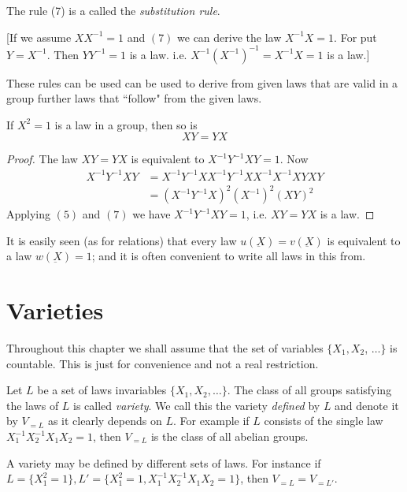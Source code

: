 The rule (7) is a called the \textit{substitution rule}.

[If we assume $XX^{-1} =1$ and $(7)$ we can derive the law $X^{-1}X =
  1$. For put $Y = X^{-1}$. Then $YY^{-1} =1$ is a law. i.e. $X^{-1}
  (X^{-1})^{-1}= X^{-1} X=1$ is a law.] 

These rules can be used can be used to derive from given laws that are
valid in a group further laws that ``follow" from the given laws. 

\begin{example*}
  If $X^2 = 1$ is a law in a group, then so is
  $$
  XY = YX
  $$
\end{example*}

\begin{proof}
  The law $XY = YX$ is equivalent to $X^{-1} Y^{-1} XY = 1$. Now 
  \begin{align*}
    X^{-1} Y^{-1} XY & = X^{-1}Y^{-1} XX^{-1} Y^{-1}XX^{-1}X^{-1} XYXY\\
    & = (X^{-1} Y^{-1}X)^2 (X^{-1})^2 (XY)^2
  \end{align*}
  Applying $(5)$ and $(7)$ we have $X^{-1}Y^{-1}XY = 1$, i.e. $XY =
  YX$ is a law.  
\end{proof}

It is easily seen (as for relations) that every law $u(\underbar{X}) =
v(\underbar{X})$ is equivalent to a law $w (\underbar{X}) = 1$; and it
is often convenient to write all laws in this from. 

\section{Varieties}\label{chap5:sec2} %

Throughout this chapter we shall assume that the set of variables 
$\bigg\{ X_1, X_2$, $\ldots \bigg\}$ is countable. This is just for
convenience and not a real restriction. 

Let $L$ be a set of laws invariables $\bigg\{ X_1, X_2, \ldots
\bigg\}$. The class of all groups satisfying the laws of $L$ is called
\textit{variety}. We call this the variety \textit{defined} by $L$ and
denote it by $V_{=L}$ as it clearly depends on $L$. For example if $L$
consists of the single law $X^{-1}_1 X^{-1}_2  X_1 X_2 =1$, then
$V_{=L}$ is the class of all abelian groups. 

A variety may be defined by different sets of laws. For instance if $L
= \bigg\{ X^2_1 = 1\bigg\}, L' = \bigg\{ X^2_1 = 1, X^{-1}_1X^{-1}_2
X_1 X_2 = 1\bigg\}$, then $V_{=L}= V_{=L'}$. 

